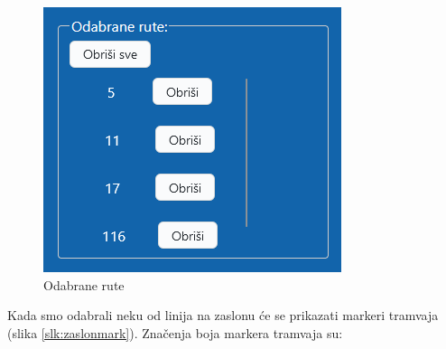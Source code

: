 \documentclass[zavrsnirad]{fer}
\begin{document}
\begin{figure}[H]
\begin{minipage}[c]{0.3\textwidth}
		\includegraphics[width=\textwidth]{Figures/odabrani.png}
		\caption{Odabrane rute}
		\label{slk:odabrane}
	\end{minipage}
\end{figure}
\newpage
Kada smo odabrali neku od linija na zaslonu će se prikazati markeri tramvaja (slika \ref{slk:zaslonmark}). 
Značenja boja markera tramvaja su:
\end{document}
